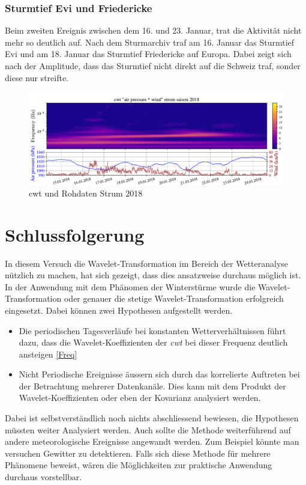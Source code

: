 \begin{refsection}
\subsubsection{Sturmtief Evi und Friedericke }
Beim zweiten Ereignis zwischen dem 16. und 23. Januar, trat die Aktivität nicht mehr so deutlich auf.
Nach dem Sturmarchiv \space \cite{online:sturmarchiv} traf am 16. Januar das Sturmtief Evi und am 18. Januar das Sturmtief Friedericke auf Europa. Dabei zeigt sich nach der Amplitude, dass das Sturmtief nicht direkt auf die Schweiz traf, sonder diese nur streifte. 

\begin{figure}[b]
	\centering
	\includegraphics[width=1\textwidth]{papers/wwt/images/storm_airp_wind_zoom2.pdf}
	\caption{cwt und Rohdaten Strum 2018}
	\label{fig:cwt_storm_zoom}
\end{figure}



\section{Schlussfolgerung}

In diesem Versuch die Wavelet-Transformation im Bereich der Wetteranalyse nützlich zu machen, hat sich gezeigt, dass dies ansatzweise durchaus möglich ist.
In der Anwendung mit dem Phänomen der Winterstürme wurde die Wavelet-Transformation oder genauer die stetige Wavelet-Transformation erfolgreich eingesetzt.
Dabei können zwei Hypothesen aufgestellt werden.
\begin{itemize}
	\item Die periodischen Tagesverläufe bei konstanten Wetterverhältnissen führt dazu, dass die Wavelet-Koeffizienten der \textit{cwt} bei dieser Frequenz deutlich ansteigen \ref{Freq}
	
	\item Nicht Periodische Ereignisse äussern sich durch das korrelierte Auftreten bei der Betrachtung mehrerer Datenkanäle. Dies kann mit dem Produkt der Wavelet-Koeffizienten oder eben der Kovarianz analysiert werden.
\end{itemize}


Dabei ist selbstverständlich noch nichts abschliessend bewiesen, die Hypothesen müssten weiter Analysiert werden.
Auch sollte die Methode weiterführend auf andere meteorologische Ereignisse angewandt werden.
Zum Beispiel könnte man versuchen Gewitter zu detektieren.
Falls sich diese Methode für mehrere Phänomene beweist, wären die Möglichkeiten zur praktische Anwendung durchaus vorstellbar. 
 

\printbibliography[heading=subbibliography]
\end{refsection}

